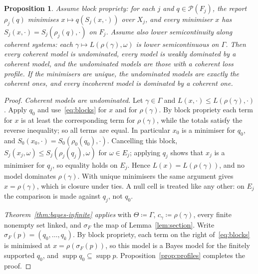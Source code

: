 \documentclass[11pt]{article}
\newtheorem{proposition}[theorem]{Proposition}
\theoremstyle{definition}
\theoremstyle{remark}
\newcommand{\PP}{\mathcal P}
\newcommand{\supp}{\operatorname{supp}}
\begin{document}
\begin{proposition}\label{prop:blocks}
Assume \emph{block propriety}: for each $j$ and $q\in\PP(F_j)$, the report $\rho_j(q)$ minimises $x\mapsto q(S_j(x,\cdot))$ over $X_j$, and every minimiser $x$ has $S_j(x,\cdot)=S_j(\rho_j(q),\cdot)$ on $F_j$. Assume also \emph{lower semicontinuity along coherent systems}: each $\gamma\mapsto L(\rho(\gamma),\omega)$ is lower semicontinuous on $\Gamma$. Then every coherent model is undominated, every model is weakly dominated by a coherent model, and the undominated models are those with a coherent loss profile. If the minimisers are unique, the undominated models are exactly the coherent ones, and every incoherent model is dominated by a coherent one.
\end{proposition}
\begin{proof}
\emph{Coherent models are undominated.} Let $\gamma\in\Gamma$ and $L(x,\cdot)\le L(\rho(\gamma),\cdot)$. Apply $q_0$ and use~\eqref{eq:blocks} for $x$ and for $\rho(\gamma)$. By block propriety each term for $x$ is at least the corresponding term for $\rho(\gamma)$, while the totals satisfy the reverse inequality; so all terms are equal. In particular $x_0$ is a minimiser for $q_0$, and $S_0(x_0,\cdot)=S_0(\rho_0(q_0),\cdot)$. Cancelling this block, $S_j(x_j,\omega)\le S_j(\rho_j(q_j),\omega)$ for $\omega\in E_j$; applying $q_j$ shows that $x_j$ is a minimiser for $q_j$, so equality holds on $E_j$. Hence $L(x)=L(\rho(\gamma))$, and no model dominates $\rho(\gamma)$. With unique minimisers the same argument gives $x=\rho(\gamma)$, which is closure under ties. A null cell is treated like any other: on $E_j$ the comparison is made against $q_j$, not $q_0$.

\emph{Theorem~\ref{thm:bayes-infinite} applies} with $\Theta\coloneqq\Gamma$, $c_\gamma\coloneqq\rho(\gamma)$, every finite nonempty set linked, and $\sigma_F$ the map of Lemma~\ref{lem:section}. Write $\sigma_F(p)=(q_0,\dots,q_k)$. By block propriety, each term on the right of~\eqref{eq:blocks} is minimised at $x=\rho(\sigma_F(p))$, so this model is a Bayes model for the finitely supported $q_0$, and $\supp q_0\subseteq\supp p$. Proposition~\ref{prop:profiles} completes the proof.
\end{proof}
\end{document}
